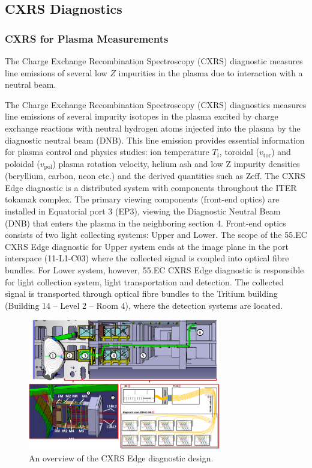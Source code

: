 \documentclass[../main.tex]{subfiles}
\begin{document}
\subsection{CXRS Diagnostics}
\subsubsection{CXRS for Plasma Measurements}
The Charge Exchange Recombination Spectroscopy (CXRS) diagnostic measures line emissions of several low $Z$ impurities in the plasma due to interaction with a neutral beam.

The Charge Exchange Recombination Spectroscopy (CXRS) diagnostics measures line emissions of several impurity isotopes in the plasma excited by charge exchange reactions with neutral hydrogen atoms injected into the plasma by the diagnostic neutral beam (DNB). This line emission provides essential information for plasma control and physics studies: ion temperature $T_i$, toroidal ($v_\text{tor}$) and poloidal ($v_\text{pol}$) plasma rotation velocity, helium ash and low Z impurity densities (beryllium, carbon, neon etc.) and the derived quantities such as Zeff.
The CXRS Edge diagnostic is a distributed system with components throughout the ITER tokamak complex. The primary viewing components (front-end optics) are installed in Equatorial port 3 (EP3), viewing the Diagnostic Neutral Beam (DNB) that enters the plasma in the neighboring section 4.
Front-end optics consists of two light collecting systems: Upper and Lower. The scope of the 55.EC CXRS Edge diagnostic for Upper system ends at the image plane in the port interspace (11-L1-C03) where the collected signal is coupled into optical fibre bundles.
For Lower system, however, 55.EC CXRS Edge diagnostic is responsible for light collection system, light transportation and detection. The collected signal is transported through optical fibre bundles to the Tritium building (Building 14 – Level 2 – Room 4), where the detection systems are located.

\begin{figure}[htbp]
    \centering
    \includegraphics[width=0.75\textwidth]{images/cxrs_edge_overview}
    \caption{An overview of the CXRS Edge diagnostic design.}%
    \label{fig:cxrs_edge_overview}
\end{figure}
\end{document}
